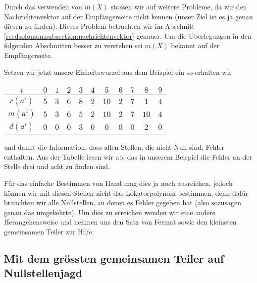 Durch das verwenden von $m(X)$ stossen wir auf weitere Probleme, da wir den Nachrichtenvektor auf der Empfängerseite nicht kennen (unser Ziel ist es ja genau diesen zu finden). Dieses Problem betrachten wir im Abschnitt \ref{reedsolomon:subsection:nachrichtenvektor} genauer. Um die Überlegungen in den folgenden Abschnitten besser zu verstehen sei $m(X)$ bekannt auf der Empfängerseite.


Setzen wir jetzt unsere Einheitswurzel aus dem Beispiel ein so erhalten wir
\begin{center}
\begin{tabular}{c c c c c c c c c c c}
	\hline
	$i$& $0$& $1$& $2$& $3$& $4$& $5$& $6$& $7$& $8$& $9$\\
	\hline
	$r(a^{i})$& $5$& $3$& $6$& $8$& $2$& $10$& $2$& $7$& $1$& $4$\\
	$m(a^{i})$& $5$& $3$& $6$& $5$& $2$& $10$& $2$& $7$& $10$& $4$\\
	$d(a^{i})$& $0$& $0$& $0$& $3$& $0$& $0$& $0$& $0$& $2$& $0$\\
	\hline
\end{tabular}
\end{center}
und damit die Information, dass allen Stellen, die nicht Null sind, Fehler enthalten. 
Aus der Tabelle lesen wir ab, das in unserem Beispiel die Fehler an der Stelle drei und acht zu finden sind.

Für das einfache Bestimmen von Hand mag dies ja noch ausreichen, jedoch können wir mit diesen Stellen nicht das Lokatorpolynom bestimmen, denn dafür bräuchten wir alle Nullstellen, an denen es Fehler gegeben hat (also sozusagen genau das umgekehrte). Um dies zu erreichen wenden wir eine andere Herangehensweise und nehmen uns den Satz von Fermat sowie den kleinsten gemeinsamen Teiler zur Hilfe.

\subsection{Mit dem grössten gemeinsamen Teiler auf Nullstellenjagd
\label{reedsolomon:subsection:ggT}}

